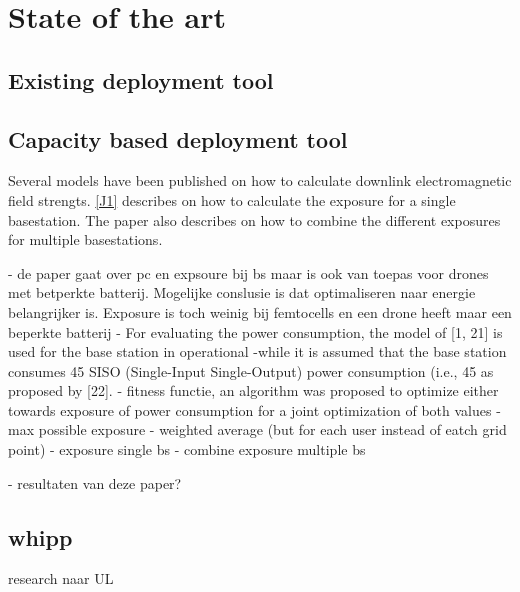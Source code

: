 \chapter{State of the art}
\label{chap:stateoftheart}

\section{Existing deployment tool}

\section{Capacity based deployment tool}
Several models have been published on how to calculate downlink electromagnetic field strengts. \ref{J1} describes on how to calculate the exposure for a single basestation.
The paper also describes on how to combine the different exposures for multiple basestations. 

- de paper gaat over pc en expsoure bij bs maar is ook van toepas voor drones met betperkte batterij. Mogelijke conslusie is dat optimaliseren naar 
energie belangrijker is. Exposure is toch weinig bij femtocells en een drone heeft maar een beperkte batterij
- For evaluating the power consumption, the model of [1, 21] is used for the base station in operational
-while it is assumed
that the base station consumes 45%
SISO (Single-Input Single-Output) power consumption
(i.e., 45%
as proposed by [22].
- fitness functie, an algorithm was proposed to optimize either towards exposure of power consumption for a joint optimization of both values
- max possible exposure
- weighted average (but for each user instead of eatch grid point)
- exposure single bs
- combine exposure multiple bs

- resultaten van deze paper?


\section{whipp}
research naar UL